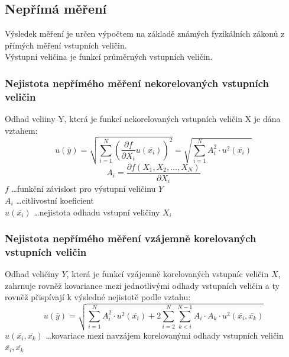 \subsection*{Nepřímá měření}
Výsledek měření je určen výpočtem na základě známých fyzikálních zákonů z přímých měření vstupních veličin.\\
Výstupní veličina je funkcí průměrných vstupních veličin.\\
\subsubsection*{Nejistota nepřímého měření nekorelovaných vstupních veličin}
Odhad veliiny Y, která je funkcí nekorelovaných vstupních veličin X je dána vztahem:
\begin{equation}
    u(\overline{y}) = \sqrt{\sum^N_{i=1}\left(\frac{\partial f}{\partial X_i}u(\overline{x_i})\right)^2} = \sqrt{\sum^N_{i=1}A_i^2\cdot u^2(\overline{x_i})}
\end{equation}
\begin{equation}
    A_i = \frac{\partial f(X_1,X_2,\dots ,X_N)}{\partial X_i}
\end{equation}
$f$ \dots funkční závislost pro výstupní veličinu $Y$ \\
$A_i$ \dots citlivostní koeficient\\
$u(\overline{x_i})$ \dots nejistota odhadu vstupní veličiny $X_i$\\
\newpage
\subsubsection*{Nejistota nepřímého měření vzájemně korelovaných vstupních veličin}
Odhad veličiny $Y$, která je funkcí vzájemně korelovaných vstupníc veličin $X$, zahrnuje rovněž kovariance mezi jednotlivými odhady vstupních veličin a ty rovněž přispívají k výsledné nejistotě podle vztahu:
\begin{equation}
    u(\overline{y}) = \sqrt{\sum^N_{i=1}A_i^2\cdot u^2(\overline{x_i})+2\sum^N_{i=2}\sum^{N-1}_{k<i}A_i\cdot A_k \cdot u^2(\overline{x_i},\overline{x_k})}
\end{equation}
$u(\overline{x_i},\overline{x_k})$ \dots kovariace mezi navzájem korelovanými odhady vstupních veličin $\overline{x_i},\overline{x_k}$



